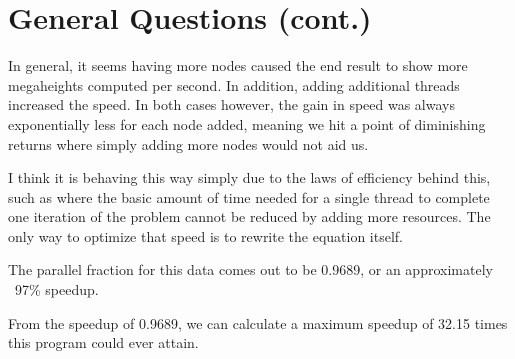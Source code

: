 \documentclass[letterpaper,10pt,onecolumn,draftclsnofoot]{IEEEtran}
\begin{document}
\section{General Questions (cont.)}

In general, it seems having more nodes caused the end result to show more megaheights computed per second.  In addition, adding additional threads increased the speed.  In both cases however, the gain in speed was always exponentially less for each node added, meaning we hit a point of diminishing returns where simply adding more nodes would not aid us.

I think it is behaving this way simply due to the laws of efficiency behind this, such as where the basic amount of time needed for a single thread to complete one iteration of the problem cannot be reduced by adding more resources.  The only way to optimize that speed is to rewrite the equation itself.

The parallel fraction for this data comes out to be 0.9689, or an approximately ~97\% speedup.

From the speedup of 0.9689, we can calculate a maximum speedup of 32.15 times this program could ever attain.
\end{document}
